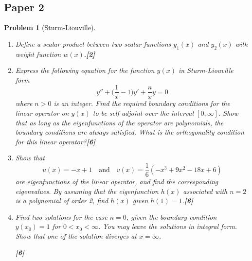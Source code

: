 \documentclass[a4paper]{article}
\theoremstyle{new}
\newtheorem{qns}{Problem}[section]
\begin{document}
\subsection{Paper 2}
\begin{qns}[Sturm-Liouville]\leavevmode
\begin{enumerate}[label=(\roman*)]
\item Define a scalar product between two scalar functions $y_1(x)$ and $y_2(x)$ with weight
function $w(x)$.\hfill\textbf{[2]}
\item Express the following equation for the function $y(x)$ in Sturm-Liouville form
$$y''+\bigg(\frac{1}{x}-1\bigg)y'+\frac{n}{x}y=0$$
where $n > 0$ is an integer. Find the required boundary conditions for the linear operator on $y(x)$ to be self-adjoint over the interval $[0,\infty]$. Show that as long as the eigenfunctions of the operator are polynomials, the boundary conditions are always satisfied. What is
the orthogonality condition for this linear operator?\hfill\textbf{[6]}
\item Show that
$$u(x) = −x + 1\quad\text{and}\quad v(x) =\frac{1}{6}(-x^3+9x^2-18x+6)$$
are eigenfunctions of the linear operator, and find the corresponding eigenvalues. By assuming that the eigenfunction $h(x)$ associated with $n = 2$ is a polynomial of order 2, find $h(x)$ given $h(1) = 1$.\hfill\textbf{[6]}
\item Find two solutions for the case $n = 0$, given the boundary condition $y(x_0) = 1$ for $0 < x_0 <\infty$. You may leave the solutions in integral form. Show that one of the solution diverges at $x = \infty$.

\hfill\textbf{[6]}
\end{enumerate}
\end{qns}
\end{document}
